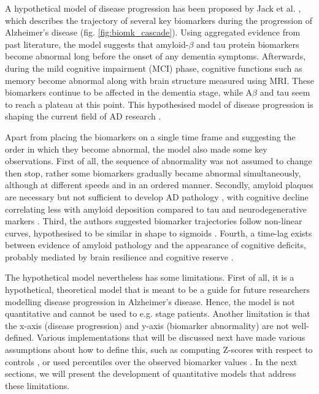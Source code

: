A hypothetical model of disease progression has been proposed by Jack et al. \cite{jack2010hypothetical,jack2013tracking}, which describes the trajectory of several key biomarkers during the progression of Alzheimer's disease (fig. \ref{fig:biomk_cascade}). Using aggregated evidence from past literature, the model suggests that amyloid-$\beta$ and tau protein biomarkers become abnormal long before the onset of any dementia symptoms. Afterwards, during the mild cognitive impairment (MCI) phase, cognitive functions such as memory become abnormal along with brain structure measured using MRI. These biomarkers continue to be affected in the dementia stage, while A$\beta$ and tau seem to reach a plateau at this point. This hypothesised model of disease progression is shaping the current field of AD research \cite{donohue2014estimating}.

Apart from placing the biomarkers on a single time frame and suggesting the order in which they become abnormal, the model also made some key observations. First of all, the sequence of abnormality was not assumed to change then stop, rather some biomarkers gradually became abnormal simultaneously, although at different speeds and in an ordered manner. Secondly, amyloid plaques are necessary but not sufficient to develop AD pathology \cite{jack2013update}, with cognitive decline correlating less with amyloid deposition \cite{jack200811c} compared to tau and neurodegenerative markers \cite{hyman2011amyloid}. Third, the authors suggested biomarker trajectories follow non-linear curves, hypothesised to be similar in shape to sigmoids \cite{jack2013update, ridha2006tracking, jack2008atrophy}. Fourth, a time-lag exists between evidence of amyloid pathology and the appearance of cognitive deficits, probably mediated by brain resilience and cognitive reserve \cite{jack2013update}.

The hypothetical model nevertheless has some limitations. First of all, it is a hypothetical, theoretical model that is meant to be a guide for future researchers modelling disease progression in Alzheimer's disease. Hence, the model is not quantitative and cannot be used to e.g. stage patients. Another limitation is that the x-axis (disease progression) and y-axis (biomarker abnormality) are not well-defined. Various implementations that will be discussed next have made various assumptions about how to define this, such as computing Z-scores with respect to controls \cite{jedynak2012computational}, or used percentiles over the observed biomarker values \cite{donohue2014estimating}. In the next sections, we will present the development of quantitative models that address these limitations.

